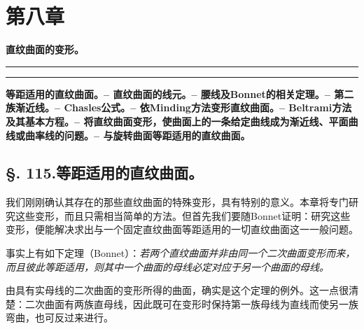 \section*{第八章}
\begin{center}
{\Large\bfseries 直纹曲面的变形。}\par
\vspace{0.5em}
\rule{3em}{0.4pt}\hspace{-0.2em}\raisebox{0.05em}{\(\bullet\)}\hspace{-0.2em}\rule{3em}{0.4pt}
\end{center}

\begin{center}\footnotesize\bfseries
等距适用的直纹曲面。-- 直纹曲面的线元。-- 腰线及Bonnet的相关定理。-- 第二族渐近线。-- Chasles公式。-- 依Minding方法变形直纹曲面。-- Beltrami方法及其基本方程。-- 将直纹曲面变形，使曲面上的一条给定曲线成为渐近线、平面曲线或曲率线的问题。-- 与旋转曲面等距适用的直纹曲面。
\end{center}

\subsection*{\S. 115.\quad 等距适用的直纹曲面。}

我们刚刚确认其存在的那些直纹曲面的特殊变形，具有特别的意义。本章将专门研究这些变形，而且只需相当简单的方法。但首先我们要随Bonnet证明：研究这些变形，便能解决求出与一个固定直纹曲面等距适用的一切直纹曲面这一一般问题。

事实上有如下定理（Bonnet）：\emph{若两个直纹曲面并非由同一个二次曲面变形而来，而且彼此等距适用，则其中一个曲面的母线必定对应于另一个曲面的母线。}

由具有实母线的二次曲面的变形所得的曲面，确实是这个定理的例外。这一点很清楚：二次曲面有两族直母线，因此既可在变形时保持第一族母线为直线而使另一族弯曲，也可反过来进行。

